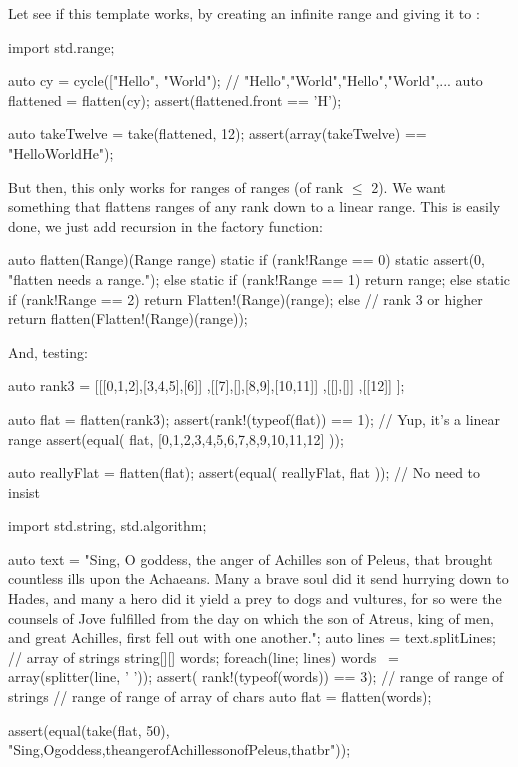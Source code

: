 Let see if this template works, by creating an infinite range and giving it to :

\begin{dcode}
import std.range;

auto cy = cycle(["Hello", "World"); // "Hello","World","Hello","World",...
auto flattened = flatten(cy);
assert(flattened.front == 'H');

auto takeTwelve = take(flattened, 12);
assert(array(takeTwelve) == "HelloWorldHe");
\end{dcode}

But then, this only works for ranges of ranges (of rank $\leq$ 2). We want something that flattens ranges of any rank down to a linear range. This is easily done, we just add recursion in the factory function:

\begin{dcode}
auto flatten(Range)(Range range)
{ 
    static if      (rank!Range == 0)
        static assert(0, "flatten needs a range.");
    else static if (rank!Range == 1)
        return range;
    else static if (rank!Range == 2)
        return Flatten!(Range)(range);
    else         // rank 3 or higher
        return flatten(Flatten!(Range)(range));
}
\end{dcode}

And, testing:

\begin{dcode}
auto rank3 = [[[0,1,2],[3,4,5],[6]]
             ,[[7],[],[8,9],[10,11]]
             ,[[],[]]
             ,[[12]]  ];

auto flat = flatten(rank3);
assert(rank!(typeof(flat)) == 1); // Yup, it's a linear range
assert(equal( flat, [0,1,2,3,4,5,6,7,8,9,10,11,12] ));

auto reallyFlat = flatten(flat);
assert(equal( reallyFlat, flat )); // No need to insist

import std.string, std.algorithm;

auto text =
"Sing, O goddess, the anger of Achilles son of Peleus,
 that brought countless ills upon the Achaeans.
 Many a brave soul did it send hurrying down to Hades,
 and many a hero did it yield a prey to dogs and vultures,
 for so were the counsels of Jove fulfilled
 from the day on which the son of Atreus, king of men,
 and great Achilles, first fell out with one another.";
auto lines = text.splitLines;   // array of strings
string[][] words;
foreach(line; lines) words ~= array(splitter(line, ' '));
assert( rank!(typeof(words)) == 3); // range of range of strings
                                    // range of range of array of chars
auto flat = flatten(words);

assert(equal(take(flat, 50), 
             "Sing,Ogoddess,theangerofAchillessonofPeleus,thatbr"));
\end{dcode}

